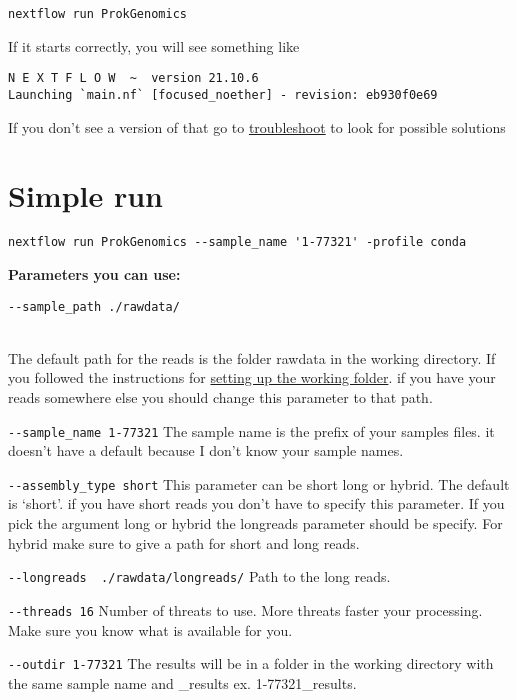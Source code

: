 \documentclass[
]{book}
\begin{document}
\begin{verbatim}
nextflow run ProkGenomics
\end{verbatim}

If it starts correctly, you will see something like

\begin{verbatim}
N E X T F L O W  ~  version 21.10.6
Launching `main.nf` [focused_noether] - revision: eb930f0e69
\end{verbatim}

If you don't see a version of that go to \href{troubleshooting.html}{troubleshoot} to look for possible solutions

\hypertarget{simple-run}{%
\section{Simple run}\label{simple-run}}

\begin{verbatim}
nextflow run ProkGenomics --sample_name '1-77321' -profile conda
\end{verbatim}

\textbf{Parameters you can use:}

\texttt{-\/-sample\_path\ ./rawdata/}\strut \\
The default path for the reads is the folder rawdata in the working directory. If you followed the instructions for \href{getting-started.html}{setting up the working folder}. if you have your reads somewhere else you should change this parameter to that path.

\texttt{-\/-sample\_name\ 1-77321}
The sample name is the prefix of your samples files. it doesn't have a default because I don't know your sample names.

\texttt{-\/-assembly\_type\ short}
This parameter can be short long or hybrid. The default is `short'. if you have short reads you don't have to specify this parameter. If you pick the argument long or hybrid the longreads parameter should be specify. For hybrid make sure to give a path for short and long reads.

\texttt{-\/-longreads\ \ ./rawdata/longreads/}
Path to the long reads.

\texttt{-\/-threads\ 16}
Number of threats to use. More threats faster your processing. Make sure you know what is available for you.

\texttt{-\/-outdir\ 1-77321}
The results will be in a folder in the working directory with the same sample name and \_results ex. 1-77321\_results.
\end{document}
